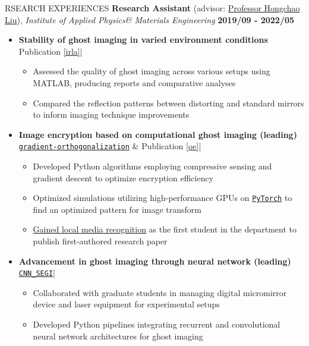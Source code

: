 \documentclass[11pt]{article} %
\begin{document}
\begin{section}{RSEARCH EXPERIENCES}
\textbf{Research Assistant} (advisor: \href{mailto:hcliu@um.edu.mo}{Professor Hongchao Liu}), \textit{Institute of Applied Physics\& Materials Engineering} \hfill \textbf{2019/09 - 2022/05} 
\begin{itemize}[leftmargin=1.5em]
    \item \textbf{Stability of ghost imaging in varied environment conditions} 
    \hfill {\footnotesize Publication \ref{irla}}| %
    \begin{itemize}[leftmargin=1.5em]
        \item Assessed the quality of ghost imaging across various setups using MATLAB, producing reports and comparative analyses
        \item Compared the reflection patterns between distorting and standard mirrors to inform imaging technique improvements
    \end{itemize}
    \item \textbf{Image encryption based on computational ghost imaging (leading)} 
    \hfill {\footnotesize \href{https://github.com/Chisen-Lupus/gradient-orthogonalization}{\texttt{gradient-orthogonalization}} \& Publication \ref{oe}}| %
    \begin{itemize}[leftmargin=1.5em]
        \item Developed Python algorithms employing compressive sensing and gradient descent to optimize encryption efficiency
        \item Optimized simulations utilizing high-performance GPUs on \href{https://pytorch.org/}{\texttt{PyTorch}} to find an optimized pattern for image transform
        \item \href{https://www.tdm.com.mo/en/news-detail/683438?isvideo=false&lang=en&category=all}{Gained local media recognition} as the first student in the department to publish first-authored research paper
    \end{itemize}
    \item \textbf{Advancement in ghost imaging through neural network (leading)} 
    \hfill {\footnotesize \href{https://github.com/Chisen-Lupus/CNN_SEGI}{\texttt{CNN\_SEGI}}}| %
    \begin{itemize}[leftmargin=1.5em]
        \item Collaborated with graduate students in managing digital micromirror device and laser equipment for experimental setups
        \item Developed Python pipelines integrating recurrent and convolutional neural network architectures for ghost imaging
    \end{itemize}
\end{itemize}


\end{section}
\end{document}
